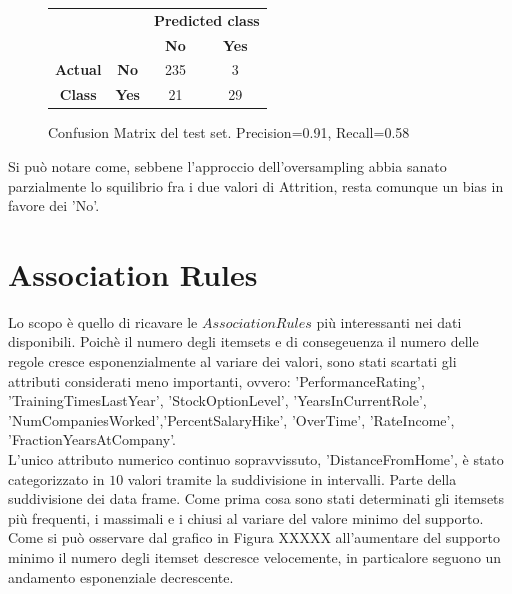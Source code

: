\documentclass[a4paper,9pt]{article}
\begin{document}
\begin{figure}[H]
    \centering
\begin{tabular}{cc|cc}
\toprule
&\bfseries      & \multicolumn{2}{c}{\bfseries Predicted class} \\
& & \bfseries No & \bfseries Yes \\
\midrule
\bfseries Actual&\bfseries No  & 235 & 3  \\
\bfseries Class &\bfseries Yes & 21 & 29  \\
\bottomrule
\end{tabular}
\caption{Confusion Matrix del test set. Precision=0.91, Recall=0.58}
\end{figure}
Si può notare come, sebbene l'approccio dell'oversampling abbia sanato parzialmente lo squilibrio fra i due valori di Attrition, resta comunque un bias in favore dei 'No'.

\section{Association Rules}
Lo scopo è quello di ricavare le $Association Rules$ più interessanti nei dati disponibili. Poichè il numero degli itemsets e di consegeuenza il numero delle regole cresce esponenzialmente al variare dei valori, sono stati scartati gli attributi considerati meno importanti, ovvero:
'PerformanceRating', 'TrainingTimesLastYear', 'StockOptionLevel',  'YearsInCurrentRole',  'NumCompaniesWorked','PercentSalaryHike',  'OverTime',  'RateIncome', 'FractionYearsAtCompany'.\\
L'unico attributo numerico continuo sopravvissuto, 'DistanceFromHome', è stato categorizzato in $10$ valori tramite la suddivisione in intervalli.
Parte della suddivisione dei data frame.
Come prima cosa sono stati determinati gli itemsets più frequenti, i massimali e i chiusi al variare del valore minimo del supporto. Come si può osservare dal grafico in Figura XXXXX all'aumentare del supporto minimo il numero degli itemset descresce velocemente, in particalore seguono un andamento esponenziale decrescente.
\end{document}
